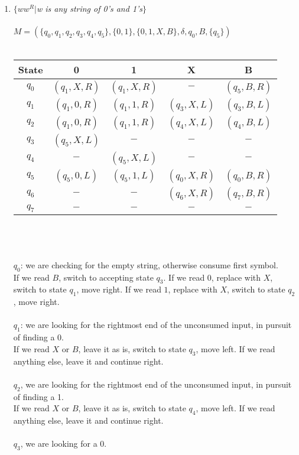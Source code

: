\documentclass[a4paper]{article}
\begin{document}
\begin{enumerate}
\begin{enumerate}[1.]
\item $\{ww^R|$\emph{w is any string of 0's and 1's}$\}$ \\
\\
$M = (\{q_0, q_1, q_2, q_3, q_4, q_5\}, \{0,1\}, \{0,1,X,B\}, \delta, q_0, B, \{q_5\})$ \\ \\
\begin{tabular}{c| c c c c}
State & 0 & 1 & X & B \\
\hline
$q_0$ & $(q_1, X, R)$ & $(q_1, X, R)$ & $-$ & $(q_5, B, R)$ \\
$q_1$ & $(q_1, 0, R)$ & $(q_1, 1, R)$ & $(q_3, X, L)$ & $(q_3, B, L)$ \\
$q_2$ & $(q_1, 0, R)$ & $(q_1, 1, R)$ & $(q_4, X, L)$ & $(q_4, B, L)$ \\
$q_3$ & $(q_5, X, L)$ & $-$ & $-$ & $-$ \\
$q_4$ & $-$ & $(q_5, X, L)$ & $-$ & $-$ \\
$q_5$ & $(q_5, 0, L)$ & $(q_5, 1, L)$ & $(q_0, X, R)$ & $(q_0, B, R)$ \\
$q_6$ & $-$ & $-$ & $(q_6, X, R)$ & $(q_7, B, R)$ \\
$q_7$ & $-$ & $-$ & $-$ & $-$ \\
\end{tabular}
\\ \\ \\
$q_0$: we are checking for the empty string, otherwise consume first symbol.
\\
If we read $B$, switch to accepting state $q_3$. If we read $0$, replace with $X$, switch to state $q_1$, move right. If we read $1$, replace with $X$, switch to state $q_2$, move right. \\
\\
$q_1$: we are looking for the rightmost end of the unconsumed input, in pursuit of finding a 0. 
\\
If we read $X$ or $B$, leave it as is, switch to state $q_3$, move left. If we read anything else, leave it and continue right. \\
\\
$q_2$, we are looking for the rightmost end of the unconsumed input, in pursuit of finding a 1. 
\\
If we read $X$ or $B$, leave it as is, switch to state $q_4$, move left. If we read anything else, leave it and continue right. \\
\\
$q_3$, we are looking for a 0. 
\\

\end{enumerate}
\end{enumerate}
\end{document}

